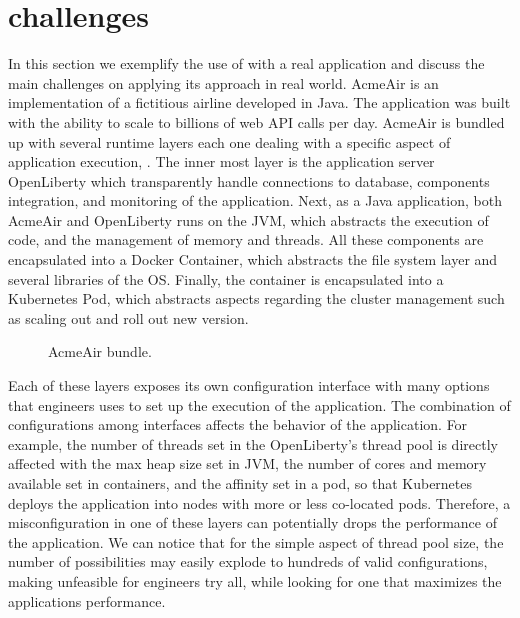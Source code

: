 \section{\name challenges}

In this section we exemplify the use of \name with a real application and
discuss the main challenges on applying its approach in real world.
AcmeAir is an
implementation of a fictitious airline developed in Java. The application was
built with the ability to scale to billions of web API calls per day. AcmeAir is
bundled up with several runtime layers each one dealing with a specific aspect
of application execution, . The inner most layer is the
application server OpenLiberty which transparently handle connections to
database, components integration, and monitoring of the application. Next, as a
Java application, both AcmeAir and OpenLiberty runs on the JVM, which abstracts
the execution of code, and the management of memory and threads. All these
components are encapsulated into a Docker Container, which abstracts the file
system layer and several libraries of the OS. Finally, the container is
encapsulated into a Kubernetes Pod, which abstracts aspects regarding the
cluster management such as scaling out and roll out new version.

\begin{figure*}[htp]
    \centering
    \def\svgwidth{\textwidth}
    \scalebox{1.0}{}
    \caption{AcmeAir bundle.}
    \label{fig:acmeair-bundle}
\end{figure*}

Each of these layers exposes its own configuration interface with many options
that engineers uses to set up the execution of the application. The combination
of configurations among interfaces affects the behavior of the application. For
example, the number of threads set in the OpenLiberty's thread pool is directly
affected with the max heap size set in JVM, the number of cores and memory
available set in containers, and the affinity set in a pod, so that Kubernetes
deploys the application into nodes with more or less co-located pods. Therefore,
a misconfiguration in one of these layers can potentially drops the performance
of the application. We can notice that for the simple aspect of thread pool
size, the number of possibilities may easily explode to hundreds of valid
configurations, making unfeasible for engineers try all, while looking for one
that maximizes the applications performance.

